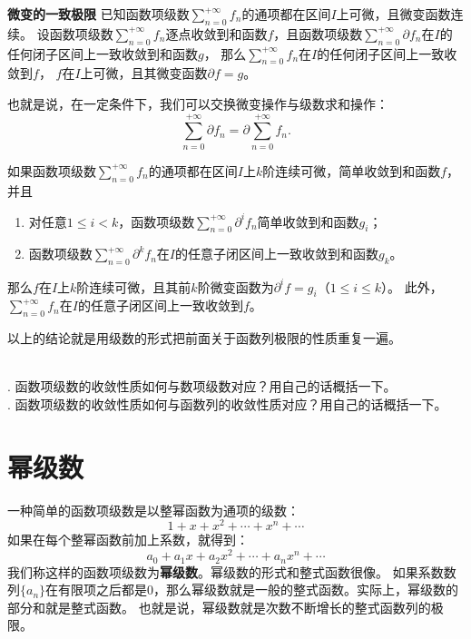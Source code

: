 \documentclass[12pt,UTF8]{ctexbook}
\begin{document}
\begin{tm}{\textbf{微变的一致极限}}
    已知函数项级数$\sum_{n=0}^{+\infty} f_n$的通项都在区间$I$上可微，且微变函数连续。
    设函数项级数$\sum_{n=0}^{+\infty} f_n$逐点收敛到和函数$f$，且函数项级数$\sum_{n=0}^{+\infty} \partial f_n$在$I$的任何闭子区间上一致收敛到和函数$g$，
    那么$\sum_{n=0}^{+\infty} f_n$在$I$的任何闭子区间上一致收敛到$f$，
    $f$在$I$上可微，且其微变函数$\partial f = g$。

    也就是说，在一定条件下，我们可以交换微变操作与级数求和操作：
    $$ \sum_{n=0}^{+\infty} \partial f_n = \partial \sum_{n=0}^{+\infty} f_n. $$
    
    如果函数项级数$\sum_{n=0}^{+\infty} f_n$的通项都在区间$I$上$k$阶连续可微，简单收敛到和函数$f$，并且
    \begin{enumerate}
        \item 对任意$1 \leqslant i < k$，函数项级数$\sum_{n=0}^{+\infty} \partial^i f_n$简单收敛到和函数$g_i$；
        \item 函数项级数$\sum_{n=0}^{+\infty} \partial^k f_n$在$I$的任意子闭区间上一致收敛到和函数$g_k$。
    \end{enumerate}
    那么$f$在$I$上$k$阶连续可微，且其前$k$阶微变函数为$\partial^i f = g_i$（$1 \leqslant i\leqslant k$）。
    此外，$\sum_{n=0}^{+\infty} f_n$在$I$的任意子闭区间上一致收敛到$f$。
\end{tm}

以上的结论就是用级数的形式把前面关于函数列极限的性质重复一遍。

\begin{sk}
    \mbox{} \\
    . 函数项级数的收敛性质如何与数项级数对应？用自己的话概括一下。\\
    . 函数项级数的收敛性质如何与函数列的收敛性质对应？用自己的话概括一下。
\end{sk}

\chapter{幂级数}

一种简单的函数项级数是以整幂函数为通项的级数：
$$ 1 + x + x^2 + \cdots + x^n + \cdots$$
如果在每个整幂函数前加上系数，就得到：
$$ a_0 + a_1x + a_2x^2 + \cdots + a_n x^n + \cdots$$
我们称这样的函数项级数为\textbf{幂级数}。幂级数的形式和整式函数很像。
如果系数数列$\{a_n\}$在有限项之后都是$0$，那么幂级数就是一般的整式函数。实际上，幂级数的部分和就是整式函数。
也就是说，幂级数就是次数不断增长的整式函数列的极限。
\end{document}
